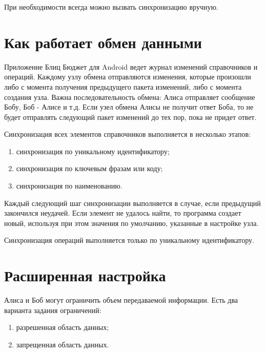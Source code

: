 \documentclass[a4paper,10pt,russian]{sphinxmanual}
\begin{document}
При необходимости всегда можно вызвать синхронизацию вручную.


\section{Как работает обмен данными}
\label{\detokenize{teamwork:id7}}
Приложение Блиц Бюджет для Android ведет журнал изменений справочников и операций. Каждому узлу обмена отправляются изменения,
которые произошли либо с момента получения предыдущего пакета изменений, либо с момента создания узла.
Важна последовательность обмена: Алиса отправляет сообщение Бобу, Боб - Алисе и т.д. Если узел обмена Алисы не
получит ответ Боба, то не будет отправлять следующий пакет изменений до тех пор, пока не придет ответ.

Синхронизация всех элементов справочников выполняется в несколько этапов:
\begin{enumerate}
\def\theenumi{\arabic{enumi}}
\def\labelenumi{\theenumi .}
\makeatletter\def\p@enumii{\p@enumi \theenumi .}\makeatother
\item {} 
синхронизация по уникальному идентификатору;

\item {} 
синхронизация по ключевым фразам или коду;

\item {} 
синхронизация по наименованию.

\end{enumerate}

Каждый следующий шаг синхронизации выполняется в случае, если предыдущий закончился неудачей. Если элемент
не удалось найти, то программа создает новый, используя при этом значения по умолчанию, указанные в настройке узла.

Синхронизация операций выполняется только по уникальному идентификатору.


\section{Расширенная настройка}
\label{\detokenize{teamwork:id8}}
Алиса и Боб могут ограничить объем передаваемой информации. Есть два варианта задания ограничений:
\begin{enumerate}
\def\theenumi{\arabic{enumi}}
\def\labelenumi{\theenumi .}
\makeatletter\def\p@enumii{\p@enumi \theenumi .}\makeatother
\item {} 
разрешенная область данных;

\item {} 
запрещенная область данных.

\end{enumerate}
\end{document}
